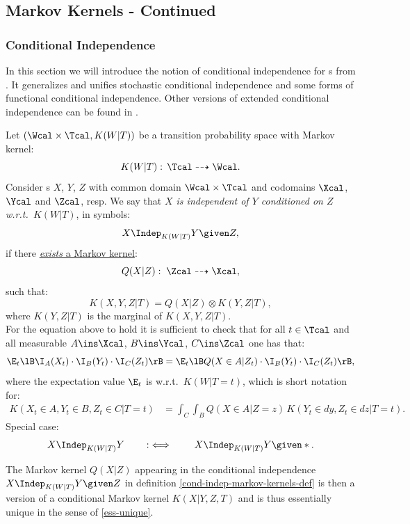 \subsection*{Markov Kernels - Continued}
\subsubsection{Conditional Independence}

In this section we will introduce the notion of conditional independence for \trv{}s from \cite{For21}. It generalizes and
unifies stochastic conditional independence and some forms of functional conditional independence. 
Other versions of extended conditional independence can be found in \cite{Daw79, Daw80, Daw01, CD17, RERS17, FM20}.


\begin{Def}
\label{cond-indep-markov-kernels-def}
Let $(\Wcal \times \Tcal, K(W|T))$ be a transition probability space with Markov kernel:
\[K(W|T): \, \Tcal \dashrightarrow  \Wcal.\]
Consider \trv{}s $X$, $Y$, $Z$ with common domain $\Wcal\times \Tcal$ and codomains $\Xcal$, 
$\Ycal$ and $\Zcal$, resp.
We say that \emph{$X$ is independent of $Y$ conditioned on $Z$ w.r.t.\ $K(W|T)$}, in symbols:
\[X \Indep_{K(W|T)} Y \given Z, \]
if there \underline{\emph{exists} a Markov kernel}: 
\[ Q(X|Z):\; \Zcal \dashrightarrow \Xcal,\]
such that:
\[ K(X,Y,Z|T) = Q(X|Z) \otimes K(Y,Z|T),\]
where $K(Y,Z|T)$ is the marginal of $K(X,Y,Z|T)$.\\
For the equation above to hold it is sufficient to check that for all $t \in \Tcal$ and all measurable $A \ins \Xcal$, $B \ins \Ycal$, $C \ins \Zcal$ one has that:
\[ \E_t\lB\I_A(X_t) \cdot \I_B(Y_t) \cdot \I_C(Z_t) \rB =\E_t\lB Q(X \in A|Z_t) \cdot \I_B(Y_t) \cdot \I_C(Z_t)\rB,   \]
where the expectation value $\E_t$ is w.r.t.\ $K(W|T=t)$, which is short notation for:
\begin{align*}
    K(X_t \in A, Y_t \in B, Z_t \in C|T=t) & = \int_C \int_B  Q(X \in A|Z=z)\,K(Y_t \in dy,Z_t \in dz|T=t).
\end{align*}
Special case:
\[X \Indep_{K(W|T)} Y \qquad :\iff \qquad X \Indep_{K(W|T)} Y \given \ast. \]
\end{Def}


\begin{Rem}
    \label{ess-unique-ci}
    The Markov kernel $Q(X|Z)$ appearing in the conditional independence $X \Indep_{K(W|T)} Y \given Z$ in definition \ref{cond-indep-markov-kernels-def} is then a version of a conditional Markov kernel $K(X|Y,Z,T)$ and is thus essentially unique in the sense of \ref{ess-unique}.
\end{Rem}

